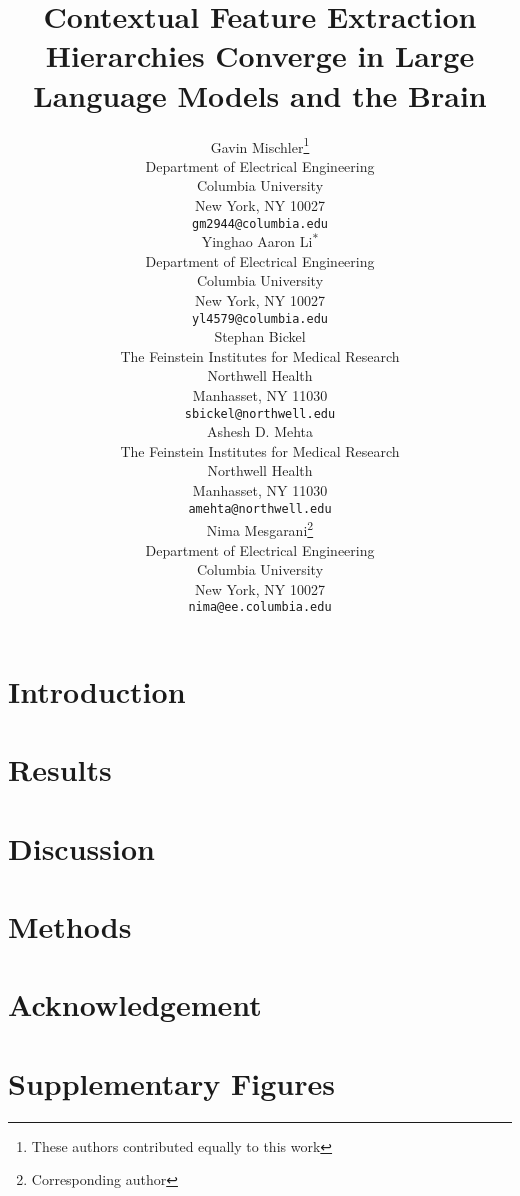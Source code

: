 \documentclass{article}
\title{Contextual Feature Extraction Hierarchies Converge in Large Language Models and the Brain}
\author{%
  Gavin Mischler\thanks{These authors contributed equally to this work} \\
  Department of Electrical Engineering\\
  Columbia University\\
  New York, NY 10027 \\
  \texttt{gm2944@columbia.edu} \\
  \And
  Yinghao Aaron Li\textsuperscript{$\ast$} \\
  Department of Electrical Engineering\\
  Columbia University\\
  New York, NY 10027 \\
  \texttt{yl4579@columbia.edu}\\
  \And
  Stephan Bickel \\
  The Feinstein Institutes for Medical Research\\
  Northwell Health\\
  Manhasset, NY 11030 \\
  \texttt{sbickel@northwell.edu}\\
  \And
  Ashesh D. Mehta \\
  The Feinstein Institutes for Medical Research\\
  Northwell Health\\
  Manhasset, NY 11030 \\
  \texttt{amehta@northwell.edu}\\
  \And
  Nima Mesgarani\thanks{Corresponding author} \\
  Department of Electrical Engineering\\
  Columbia University\\
  New York, NY 10027 \\
  \texttt{nima@ee.columbia.edu}
}
\begin{document}
\maketitle


\begin{abstract}


  
\end{abstract}

\setcounter{figure}{0}

\section{Introduction}


\section{Results}


\section{Discussion}


\section{Methods}


\section*{Acknowledgement}




\newpage

\section{Supplementary Figures}

\end{document}
